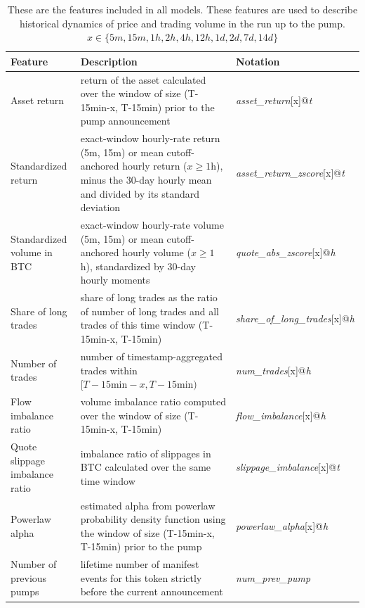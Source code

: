 \documentclass{ieeeaccess}
\begin{document}
\begin{table}[!tbp]
    \centering
    \small
    \renewcommand{\arraystretch}{1.25}
    \setlength{\tabcolsep}{10pt}
    \begin{tabular}{p{3cm}p{7cm}l}
        \hline
        \textbf{Feature} & \textbf{Description} & \textbf{Notation} \\
        \hline
        Asset return & return of the asset calculated over the window of size (T-15min-x, T-15min) prior to the pump announcement& \textit{asset\_return}[x]@\textit{t} \\
        \hline
        Standardized return & exact-window hourly-rate return (5m, 15m) or mean cutoff-anchored hourly return ($x\geq1$h), minus the 30-day hourly mean and divided by its standard deviation & \textit{asset\_return\_zscore}[x]@\textit{t} \\
        \hline
        Standardized volume in BTC & exact-window hourly-rate volume (5m, 15m) or mean cutoff-anchored hourly volume ($x\geq1$h), standardized by 30-day hourly moments & \textit{quote\_abs\_zscore}[x]@\textit{h} \\
        \hline
        Share of long trades & share of long trades as the ratio of number of long trades and all trades of this time window (T-15min-x, T-15min) & \textit{share\_of\_long\_trades}[x]@\textit{h} \\
        \hline
        Number of trades & number of timestamp-aggregated trades within $[T-15\mathrm{min}-x,T-15\mathrm{min})$ & \textit{num\_trades}[x]@\textit{h} \\
        \hline
        Flow imbalance ratio & volume imbalance ratio computed over the window of size (T-15min-x, T-15min) & \textit{flow\_imbalance}[x]@\textit{h} \\
        \hline
        Quote slippage imbalance ratio & imbalance ratio of slippages in BTC calculated over the same time window & \textit{slippage\_imbalance}[x]@\textit{t} \\
        \hline
        Powerlaw alpha & estimated alpha from powerlaw probability density function using the window of size (T-15min-x, T-15min) prior to the pump & \textit{powerlaw\_alpha}[x]@\textit{h} \\
        \hline
        Number of previous pumps & lifetime number of manifest events for this token strictly before the current announcement & \textit{num\_prev\_pump} \\
        \hline
    \end{tabular}
    \caption{These are the features included in all models. These features are used to describe historical dynamics of price and trading volume in the run up to the pump. $x \in \{5m, 15m, 1h, 2h, 4h, 12h, 1d, 2d, 7d, 14d\}$}
    \label{table:feature_descriptions}
\end{table}
\end{document}
